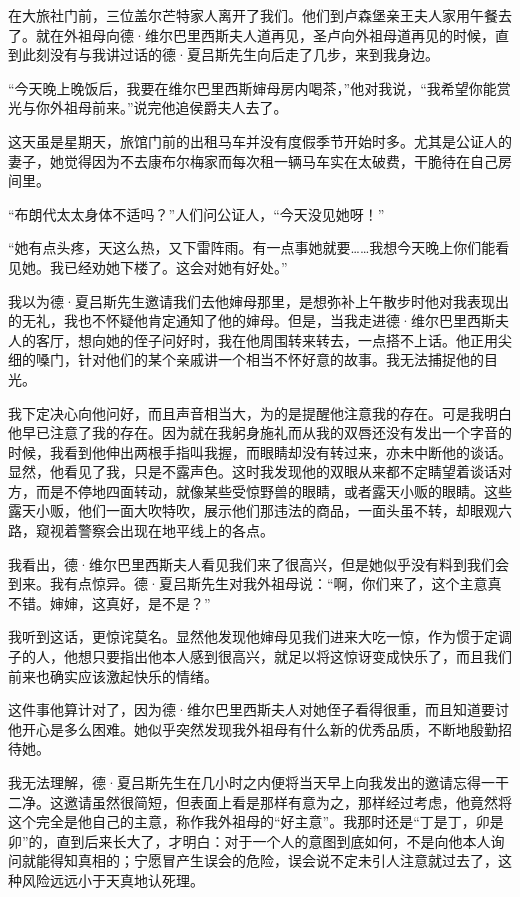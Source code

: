 \par 在大旅社门前，三位盖尔芒特家人离开了我们。他们到卢森堡亲王夫人家用午餐去了。就在外祖母向德·维尔巴里西斯夫人道再见，圣卢向外祖母道再见的时候，直到此刻没有与我讲过话的德·夏吕斯先生向后走了几步，来到我身边。
\par “今天晚上晚饭后，我要在维尔巴里西斯婶母房内喝茶，”他对我说，“我希望你能赏光与你外祖母前来。”说完他追侯爵夫人去了。
\par 这天虽是星期天，旅馆门前的出租马车并没有度假季节开始时多。尤其是公证人的妻子，她觉得因为不去康布尔梅家而每次租一辆马车实在太破费，干脆待在自己房间里。
\par “布朗代太太身体不适吗？”人们问公证人，“今天没见她呀！”
\par “她有点头疼，天这么热，又下雷阵雨。有一点事她就要……我想今天晚上你们能看见她。我已经劝她下楼了。这会对她有好处。”
\par 我以为德·夏吕斯先生邀请我们去他婶母那里，是想弥补上午散步时他对我表现出的无礼，我也不怀疑他肯定通知了他的婶母。但是，当我走进德·维尔巴里西斯夫人的客厅，想向她的侄子问好时，我在他周围转来转去，一点搭不上话。他正用尖细的嗓门，针对他们的某个亲戚讲一个相当不怀好意的故事。我无法捕捉他的目光。
\par 我下定决心向他问好，而且声音相当大，为的是提醒他注意我的存在。可是我明白他早已注意了我的存在。因为就在我躬身施礼而从我的双唇还没有发出一个字音的时候，我看到他伸出两根手指叫我握，而眼睛却没有转过来，亦未中断他的谈话。显然，他看见了我，只是不露声色。这时我发现他的双眼从来都不定睛望着谈话对方，而是不停地四面转动，就像某些受惊野兽的眼睛，或者露天小贩的眼睛。这些露天小贩，他们一面大吹特吹，展示他们那违法的商品，一面头虽不转，却眼观六路，窥视着警察会出现在地平线上的各点。
\par 我看出，德·维尔巴里西斯夫人看见我们来了很高兴，但是她似乎没有料到我们会到来。我有点惊异。德·夏吕斯先生对我外祖母说：“啊，你们来了，这个主意真不错。婶婶，这真好，是不是？”
\par 我听到这话，更惊诧莫名。显然他发现他婶母见我们进来大吃一惊，作为惯于定调子的人，他想只要指出他本人感到很高兴，就足以将这惊讶变成快乐了，而且我们前来也确实应该激起快乐的情绪。
\par 这件事他算计对了，因为德·维尔巴里西斯夫人对她侄子看得很重，而且知道要讨他开心是多么困难。她似乎突然发现我外祖母有什么新的优秀品质，不断地殷勤招待她。
\par 我无法理解，德·夏吕斯先生在几小时之内便将当天早上向我发出的邀请忘得一干二净。这邀请虽然很简短，但表面上看是那样有意为之，那样经过考虑，他竟然将这个完全是他自己的主意，称作我外祖母的“好主意”。我那时还是“丁是丁，卯是卯”的，直到后来长大了，才明白：对于一个人的意图到底如何，不是向他本人询问就能得知真相的；宁愿冒产生误会的危险，误会说不定未引人注意就过去了，这种风险远远小于天真地认死理。

